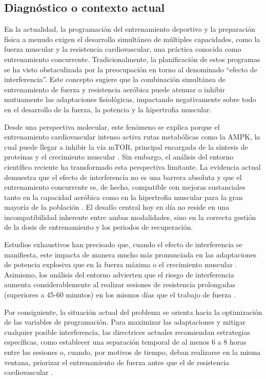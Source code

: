 \documentclass[12pt]{article}
\begin{document}
\subsection{Diagnóstico o contexto actual}
En la actualidad, la programación del entrenamiento deportivo y la preparación física a menudo exigen el desarrollo simultáneo de múltiples capacidades, como la fuerza muscular y la resistencia cardiovascular, una práctica conocida como entrenamiento concurrente. Tradicionalmente, la planificación de estos programas se ha visto obstaculizada por la preocupación en torno al denominado ``efecto de interferencia''. Este concepto sugiere que la combinación simultánea de entrenamiento de fuerza y resistencia aeróbica puede atenuar o inhibir mutuamente las adaptaciones fisiológicas, impactando negativamente sobre todo en el desarrollo de la fuerza, la potencia y la hipertrofia muscular.

Desde una perspectiva molecular, este fenómeno se explica porque el entrenamiento cardiovascular intenso activa rutas metabólicas como la AMPK, la cual puede llegar a inhibir la vía mTOR, principal encargada de la síntesis de proteínas y el crecimiento muscular \citep{aptavs2025concurrente}. Sin embargo, el análisis del entorno científico reciente ha transformado esta perspectiva limitante. La evidencia actual demuestra que el efecto de interferencia no es una barrera absoluta y que el entrenamiento concurrente es, de hecho, compatible con mejoras sustanciales tanto en la capacidad aeróbica como en la hipertrofia muscular para la gran mayoría de la población \citep{fisiologiadelejercicio}. El desafío central hoy en día no reside en una incompatibilidad inherente entre ambas modalidades, sino en la correcta gestión de la dosis de entrenamiento y los periodos de recuperación. 

Estudios exhaustivos han precisado que, cuando el efecto de interferencia se manifiesta, este impacta de manera mucho más pronunciada en las adaptaciones de potencia explosiva que en la fuerza máxima o el crecimiento muscular \citep{fisiologiadelejercicio}. Asimismo, los análisis del entorno advierten que el riesgo de interferencia aumenta considerablemente al realizar sesiones de resistencia prolongadas (superiores a 45-60 minutos) en los mismos días que el trabajo de fuerza \citep{aptavs2025concurrente}. 

Por consiguiente, la situación actual del problema se orienta hacia la optimización de las variables de programación. Para maximizar las adaptaciones y mitigar cualquier posible interferencia, las directrices actuales recomiendan estrategias específicas, como establecer una separación temporal de al menos 6 a 8 horas entre las sesiones \citep{aptavs2025concurrente, fisiologiadelejercicio} o, cuando, por motivos de tiempo, deban realizarse en la misma ventana, priorizar el entrenamiento de fuerza antes que el de resistencia cardiovascular \citep{aptavs2025concurrente}.
\newpage
\end{document}

